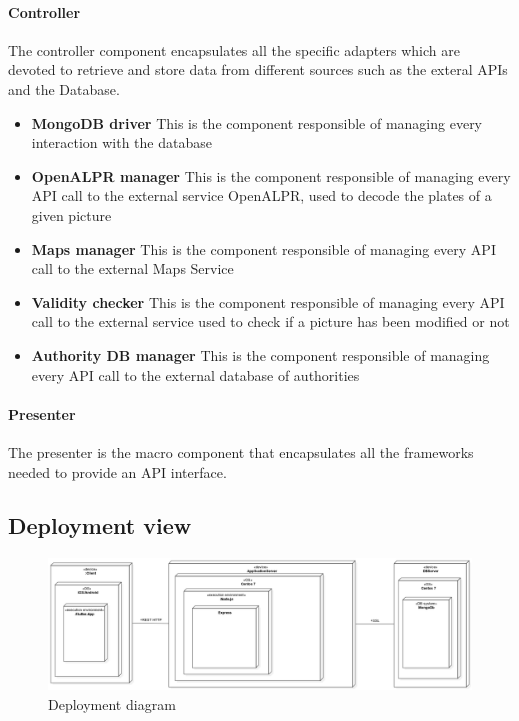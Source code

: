 \paragraph{Controller}
The controller component encapsulates all the specific adapters which are devoted to retrieve and store data from different sources such as the exteral APIs and the Database.
\begin{itemize}
  \item \textbf{MongoDB driver} This is the component responsible of managing every interaction with the database
  \item \textbf{OpenALPR manager} This is the component responsible of managing every API call to the external service OpenALPR, used to decode the plates of a given picture
  \item \textbf{Maps manager} This is the component responsible of managing every API call to the external Maps Service
  \item \textbf{Validity checker} This is the component responsible of managing every API call to the external service used to check if a picture has been modified or not
  \item \textbf{Authority DB manager} This is the component responsible of managing every API call to the external database of authorities
\end{itemize}


\paragraph{Presenter}
The presenter is the macro component that encapsulates all the frameworks needed to provide an API interface.

\subsection{Deployment view} \label{deploysect}
\begin{figure}[h]
\centering
\includegraphics[width=\textwidth]{Images/DeploymentDiagram1.png}
\caption{\label{fig:deploy} Deployment diagram}
\end{figure}

